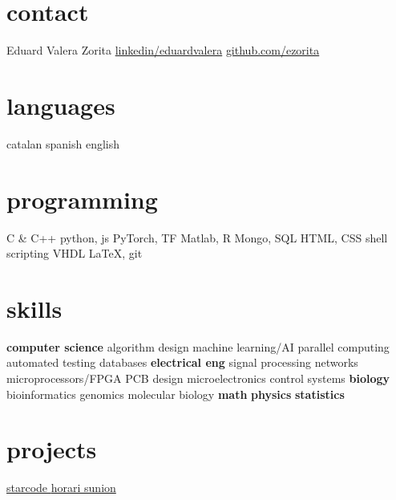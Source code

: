\documentclass[]{friggeri-cv} %
\begin{document}



\begin{aside} %
  \section{contact}
  {\FA \faUser}
  Eduard Valera Zorita
  {\FA \faLinkedinSign}
  \href{http://www.linkedin.com/in/eduardvalera}{linkedin/eduardvalera}
  {\FA \faGithubSign}
  \href{http://github.com/ezorita}{github.com/ezorita}
  \section{languages}
  catalan
  spanish
  english
  \section{programming}
  C \& C++
  python, js
  PyTorch, TF
  Matlab, R
  Mongo, SQL
  HTML, CSS
  shell scripting
  VHDL
  \LaTeX, git
  \section{skills}
  {\bf computer science}
  algorithm design
  machine learning/AI
  parallel computing
  automated testing
  databases
  {\bf electrical eng}
  signal processing
  networks
  microprocessors/FPGA
  PCB design
  microelectronics
  control systems
  {\bf biology}
  bioinformatics
  genomics
  molecular biology
  {\bf math}
  {\bf physics}
  {\bf statistics}
  \section{projects}
  \href{http://github.com/gui11aume/starcode}{starcode {\FA \faExternalLink}}
  \href{http://horari.sunion.cat}{horari sunion {\FA \faExternalLink}}
\end{aside}

\end{document}
